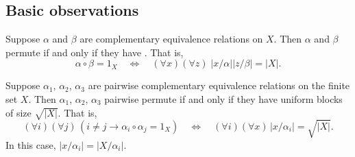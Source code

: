 \subsection{Basic observations}
\begin{lemma}
\label{lem:1}
Suppose $\alpha$ and $\beta$ are complementary equivalence relations on
$X$. Then $\alpha$ and $\beta$ permute if and only if they have \cubs.
That is,
\begin{equation}
  \label{eq:9}
\alpha \circ \beta =1_X \quad \Longleftrightarrow \quad (\forall x)(\forall z)\;
|x/\alpha| |z/\beta| = |X|.
\end{equation}
\end{lemma}
\begin{corollary}
\label{cor:1}
Suppose $\alpha_1$, $\alpha_2$, $\alpha_3$ are pairwise complementary
equivalence relations on the finite set $X$. 
Then  $\alpha_1$, $\alpha_2$, $\alpha_3$ pairwise permute if and only if they
have uniform blocks of size $\sqrt{|X|}$.  That is,
\[
(\forall i)(\forall j) \, (i\neq j \longrightarrow \alpha_i \circ \alpha_j = 1_X)
\quad \Longleftrightarrow \quad (\forall i)(\forall x) \, |x/\alpha_i| =
\sqrt{|X|}.
\]
In this case,  $|x/\alpha_i| = |X/\alpha_i|$. %
\end{corollary}
